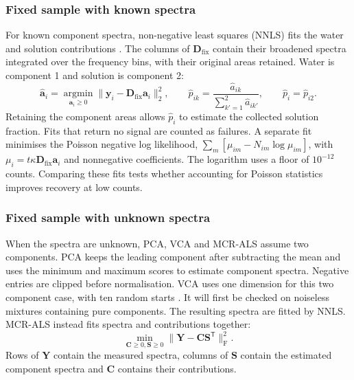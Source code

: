 \documentclass[11pt]{article}
\begin{document}
\subsubsection{Fixed sample with known spectra}

For known component spectra, non-negative least squares (NNLS) fits the water and solution contributions \citep{lawson1995}. The columns of $\mathbf D_{\mathrm{fix}}$ contain their broadened spectra integrated over the frequency bins, with their original areas retained. Water is component 1 and solution is component 2:
\begin{equation}
 \widehat{\mathbf a}_i=\underset{\mathbf a_i\geq0}{\operatorname{argmin}}
 \|\mathbf y_i-\mathbf D_{\mathrm{fix}}\mathbf a_i\|_2^2,\qquad
 \widehat p_{ik}=\frac{\widehat a_{ik}}{\sum_{k'=1}^{2}\widehat a_{ik'}},\qquad
 \widehat p_i=\widehat p_{i2}.
 \label{eq:known_fit}
\end{equation}
Retaining the component areas allows $\widehat p_i$ to estimate the collected solution fraction. Fits that return no signal are counted as failures. A separate fit minimises the Poisson negative log likelihood, $\sum_m[\mu_{im}-N_{im}\log\mu_{im}]$, with $\mu_i=t\kappa\mathbf D_{\mathrm{fix}}\mathbf a_i$ and nonnegative coefficients. The logarithm uses a floor of $10^{-12}$ counts. Comparing these fits tests whether accounting for Poisson statistics improves recovery at low counts.

\subsubsection{Fixed sample with unknown spectra}

When the spectra are unknown, PCA, VCA and MCR-ALS assume two components. PCA keeps the leading component after subtracting the mean and uses the minimum and maximum scores to estimate component spectra. Negative entries are clipped before normalisation. VCA uses one dimension for this two component case, with ten random starts \citep{nascimento2005}. It will first be checked on noiseless mixtures containing pure components. The resulting spectra are fitted by NNLS. MCR-ALS instead fits spectra and contributions together:
\begin{equation}
 \min_{\mathbf C\geq0,\mathbf S\geq0}
 \|\mathbf Y-\mathbf C\mathbf S^{\mathsf T}\|_{\mathrm F}^{2}.
 \label{eq:mcr}
\end{equation}
Rows of $\mathbf Y$ contain the measured spectra, columns of $\mathbf S$ contain the estimated component spectra and $\mathbf C$ contains their contributions.
\end{document}
